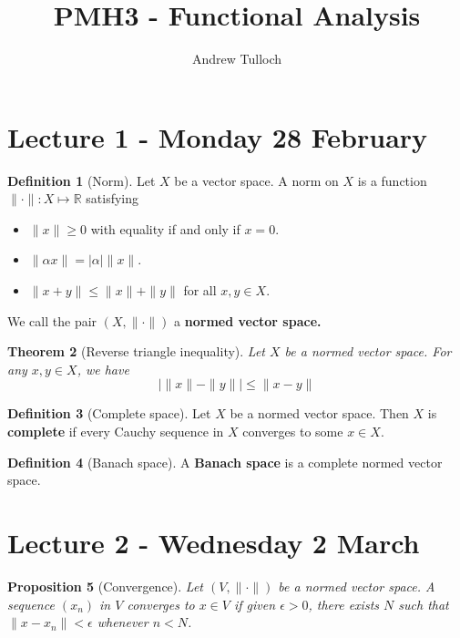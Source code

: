 \documentclass[10pt, oneside, reqno]{amsart}
\title{PMH3 - Functional Analysis}								%
\author{Andrew Tulloch}
\theoremstyle{plain}%
\newtheorem{thm}{Theorem}[section]
\newtheorem{prop}[thm]{Proposition}
\theoremstyle{definition}
\newtheorem{defn}[thm]{Definition}
\theoremstyle{remark}
\newcommand{\R}{\mathbb{R}}
\begin{document}
\maketitle \tableofcontents \clearpage

\section{Lecture 1 - Monday 28 February} %
\label{sec:lecture_1_28_february}

\begin{defn}[Norm]
	Let $X$ be a vector space.  A norm on $X$ is a function $\| \cdot \| : X \mapsto \R$ satisfying 
	\begin{itemize}
		\item $\| x \| \geq 0$ with equality if and only if $x = 0$.  
		\item $\| \alpha x \| = | \alpha | \| x \|$.
		\item $\| x + y \| \leq \| x \| + \| y \|$ for all $x, y \in X$.  
	\end{itemize}
	
	We call the pair $(X, \| \cdot \|)$ a \textbf{normed vector space.}
\end{defn}

\begin{thm}[Reverse triangle inequality]
	Let $X$ be a normed vector space.  For any $x, y \in X$, we have \[
		\left| \|x \| - \| y \| \right| \leq \| x - y \|  
	\]
\end{thm}

\begin{defn}[Complete space]
	Let $X$ be a normed vector space.  Then $X$ is \textbf{complete} if every Cauchy sequence in $X$ converges to some $x \in X$.  
\end{defn}

\begin{defn}[Banach space]
	A \textbf{Banach space} is a complete normed vector space.
\end{defn}



\section{Lecture 2 - Wednesday 2 March} %
\label{sec:lecture_2_2_march}

\begin{prop}[Convergence] Let $(V, \| \cdot \| )$ be a normed vector space.  A sequence $(x_n)$ in $V$ converges to $x \in V$ if given $\epsilon > 0$, there exists $N$ such that $\| x - x_n \| < \epsilon$ whenever $n < N$. 
\end{prop}
\end{document}
